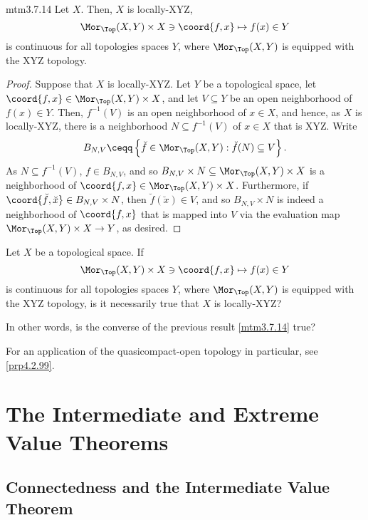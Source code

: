 \begin{mtm}{}{mtm3.7.14}
	Let $X$.  Then, $X$ is locally-XYZ,
	\begin{equation}
		\Mor _{\Top}(X,Y)\times X\ni \coord{f,x}\mapsto f(x)\in Y
	\end{equation}
	is continuous for all topologies spaces $Y$, where $\Mor _{\Top}(X,Y)$ is equipped with the XYZ topology.
	\begin{proof}
		Suppose that $X$ is locally-XYZ.  Let $Y$ be a topological space, let $\coord{f,x}\in \Mor _{\Top}(X,Y)\times X$, and let $V\subseteq Y$ be an open neighborhood of $f(x)\in Y$.  Then, $f^{-1}(V)$ is an open neighborhood of $x\in X$, and hence, as $X$ is locally-XYZ, there is a neighborhood $N\subseteq f^{-1}(V)$ of $x\in X$ that is XYZ.  Write
		\begin{equation}
			B_{N,V}\ceqq \left\{ \breve{f}\in \Mor _{\Top}(X,Y):\breve{f}(N)\subseteq V\right\} .
		\end{equation}
		As $N\subseteq f^{-1}(V)$, $f\in B_{N,V}$, and so $B_{N,V}\times N\subseteq \Mor _{\Top}(X,Y)\times X$ is a neighborhood of $\coord{f,x}\in \Mor _{\Top}(X,Y)\times X$.  Furthermore, if $\coord{\breve{f},\breve{x}}\in B_{N,V}\times N$, then $\breve{f}(\breve{x})\in V$, and so $B_{N,V}\times N$ is indeed a neighborhood of $\coord{f,x}$ that is mapped into $V$ via the evaluation map $\Mor _{\Top}(X,Y)\times X\rightarrow Y$, as desired.
	\end{proof}
\end{mtm}
\begin{exr}{}{}
	Let $X$ be a topological space.  If
	\begin{equation}
		\Mor _{\Top}(X,Y)\times X\ni \coord{f,x}\mapsto f(x)\in Y
	\end{equation}
	is continuous for all topologies spaces $Y$, where $\Mor _{\Top}(X,Y)$ is equipped with the XYZ topology, is it necessarily true that $X$ is locally-XYZ?
	\begin{rmk}
		In other words, is the converse of the previous result \cref{mtm3.7.14} true?
	\end{rmk}
\end{exr}
For an application of the quasicompact-open topology in particular, see \cref{prp4.2.99}.

\section[The IVT and EVT]{The Intermediate and Extreme Value Theorems}

\subsection[Connectedness and the IVT]{Connectedness and the Intermediate Value Theorem}

